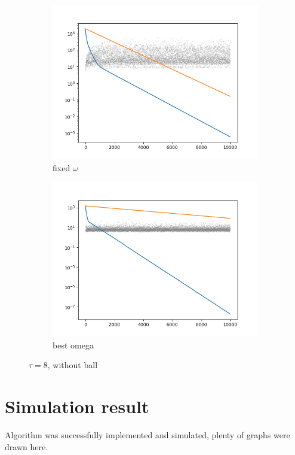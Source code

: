 \documentclass[11pt]{book}
\begin{document}
\begin{figure}[H]
	\centering
	\begin{subfigure}{.5\textwidth}
		\centering
		\includegraphics[width=.8\linewidth]{f8n.png}
		\caption{fixed $\omega$}
		\label{fig:sub11}
	\end{subfigure}%
	\begin{subfigure}{.5\textwidth}
		\centering
		\includegraphics[width=.8\linewidth]{b8n.png}
		\caption{best omega}
		\label{fig:sub12}
	\end{subfigure}
	\caption{$\tau=8$, without ball}
	\label{fig:test6}
\end{figure}

\newpage

\section{Simulation result}

Algorithm was successfully implemented and simulated, plenty of graphs were drawn here.\\
\end{document}
